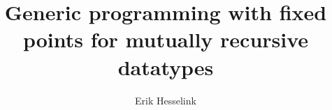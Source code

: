 \documentclass[11pt, twoside, dvipdfm, a4paper, openright]{report}
\begin{document}
\title{Generic programming with fixed points for mutually recursive datatypes}
\author{Erik Hesselink}

\maketitle
\tableofcontents







\end{document}
